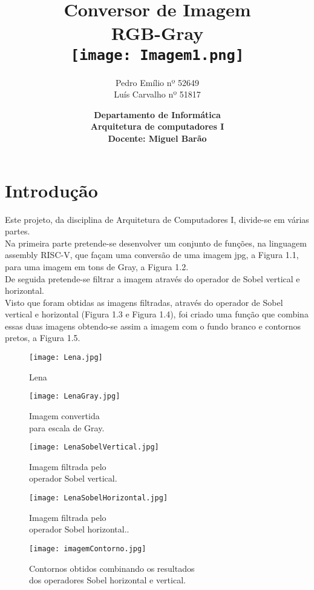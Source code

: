 \documentclass{report}
\title{\textbf{Conversor de Imagem \\
{\Large RGB-Gray}} \\
\vspace{1.5cm}
\texttt{[image: Imagem1.png]}
}
\author{Pedro Emílio nº 52649 \\ Luís Carvalho nº 51817}
\date{\textbf{Departamento de Informática \\ Arquitetura de computadores I \\ Docente: Miguel Barão}}
\begin{document}
\maketitle

\tableofcontents

\chapter{Introdução}
Este projeto, da disciplina de Arquitetura de Computadores I, divide-se em várias partes.\\
Na primeira parte pretende-se desenvolver um conjunto de funções, na linguagem assembly RISC-V, que façam uma conversão de uma imagem jpg, a Figura 1.1, para uma imagem em tons de Gray, a Figura 1.2.\\
De seguida pretende-se filtrar a imagem através do operador de Sobel vertical e horizontal.\\
Visto que foram obtidas as imagens filtradas, através do operador de Sobel vertical e horizontal (Figura 1.3 e Figura 1.4), foi criado uma função que combina essas duas imagens obtendo-se assim a imagem com o fundo branco e contornos pretos, a Figura 1.5.\\

\begin{figure}[h]
    \centering
    
    \begin{minipage}{.49\textwidth}
    \centering
    \texttt{[image: Lena.jpg]}
    \caption{Lena}
    \label{fig:my_label}
    \end{minipage}
    \hfill
    \begin{minipage}{.49\textwidth}
    \centering
    \texttt{[image: LenaGray.jpg]}
    \caption{Imagem convertida \\ para escala de Gray.}
    \label{fig:my_label}
    \end{minipage}
\end{figure}

\begin{figure}
    \centering
    \texttt{[image: LenaSobelVertical.jpg]}
    \caption{Imagem filtrada pelo \\ operador Sobel vertical.}
    \label{fig:my_label}
\end{figure}

\begin{figure}[h]
    \centering
    
    \begin{minipage}{.49\textwidth}
    \centering
    \texttt{[image: LenaSobelHorizontal.jpg]}
    \caption{Imagem filtrada pelo \\ operador Sobel horizontal..}
    \label{fig:my_label}
    \end{minipage}
    \hfill
    \begin{minipage}{.49\textwidth}
    \centering
    \texttt{[image: imagemContorno.jpg]}
    \caption{Contornos obtidos combinando os resultados \\ dos operadores Sobel horizontal e vertical.}
    \label{fig:my_label}
    \end{minipage}
\end{figure}
\end{document}
